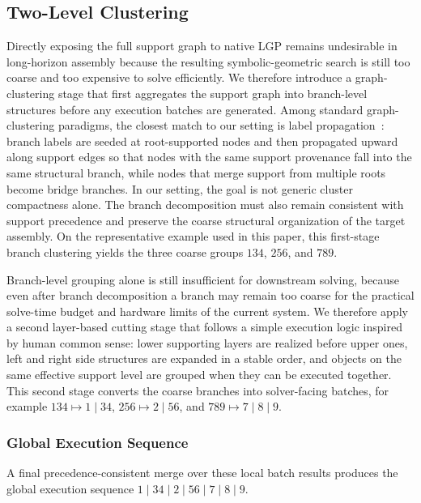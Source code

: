 \documentclass[journal]{IEEEtran}
\begin{document}
  \subsection{Two-Level Clustering}
  \label{subsec:phase2}

  Directly exposing the full support graph to native LGP remains undesirable in long-horizon
  assembly because the resulting symbolic-geometric search is still too coarse and too
  expensive to solve efficiently. We therefore introduce a graph-clustering stage that
  first aggregates the support graph into branch-level structures before any execution
  batches are generated. Among standard graph-clustering paradigms, the closest match to
  our setting is label propagation~\cite{cite_label_propagation_2007}: branch labels are
  seeded at root-supported nodes and then propagated upward along support edges so that
  nodes with the same support provenance fall into the same structural branch, while
  nodes that merge support from multiple roots become bridge branches. In our setting,
  the goal is not generic cluster compactness alone. The branch
  decomposition must also remain consistent with support precedence and preserve the
  coarse structural organization of the target assembly. On the representative example
  used in this paper, this first-stage branch clustering yields the three coarse groups
  $134$, $256$, and $789$.

  Branch-level grouping alone is still insufficient for downstream solving, because even
  after branch decomposition a branch may remain too coarse for the practical solve-time
  budget and hardware limits of the current system. We therefore apply a second
  layer-based cutting stage that follows a simple execution logic inspired by human
  common sense: lower supporting layers are realized before upper ones, left and right
  side structures are expanded in a stable order, and objects on the same effective
  support level are grouped when they can be executed together. This second stage
  converts the coarse branches into solver-facing batches, for example
  $134 \mapsto 1 \mid 34$, $256 \mapsto 2 \mid 56$, and $789 \mapsto 7 \mid 8 \mid 9$.

  \subsubsection{Global Execution Sequence}
  \label{subsec:phase2_global}

  A final precedence-consistent merge over these local batch results produces the global
  execution sequence $1 \mid 34 \mid 2 \mid 56 \mid 7 \mid 8 \mid 9$.
\end{document}
